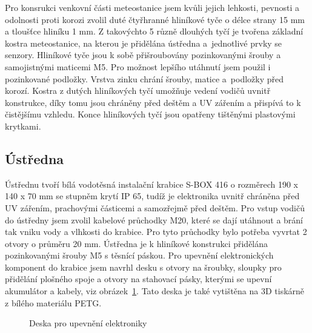         Pro konsrukci venkovní části meteostanice jsem kvůli jejich lehkosti, pevnosti a odolnosti proti korozi zvolil duté čtyřhranné hliníkové tyče o délce strany 15 mm a tloušťce hliníku 1 mm. Z takovýchto 5 různě dlouhých tyčí je tvořena základní kostra meteostanice, na kterou je přidělána ústředna a~jednotlivé prvky se senzory. Hliníkové tyče jsou k sobě přišroubovány pozinkovanými šrouby a samojistnými maticemi M5. Pro možnost lepšího utáhnutí jsem použil i pozinkované podložky. Vrstva zinku chrání šrouby, matice a~podložky před korozí. Kostra z dutých hliníkových tyčí umožňuje vedení vodičů uvnitř konstrukce, díky tomu jsou chráněny před deštěm a UV zářením a přispívá to k čistějšímu vzhledu. Konce hliníkových tyčí jsou opatřeny tištěnými plastovými krytkami.
        \newpage

        \subsection{Ústředna}    
            Ústřednu tvoří bílá vodotěsná instalační krabice S-BOX 416 o rozměrech 190 x 140 x 70 mm se stupněm krytí IP 65, tudíž je elektronika uvnitř chráněna před UV zářením, prachovými částicemi a samozřejmě před deštěm. Pro vstup vodičů do ústředny jsem zvolil kabelové průchodky M20, které se dají utáhnout a brání tak vniku vody a vlhkosti do krabice. Pro tyto průchodky bylo potřeba vyvrtat 2 otvory o průměru 20 mm. Ústředna je k hliníkové konstrukci přidělána pozinkovanými šrouby M5 s těsnící páskou. Pro upevnění elektronických komponent do krabice jsem navrhl desku s otvory na šroubky, sloupky pro přidělání plošného spoje a otvory na stahovací pásky, kterými se upevní akumulátor a kabely, viz obrázek~\ref{Deska}. Tato deska je také vytištěna na 3D tiskárně z bílého materiálu PETG.

            \begin{figure}[htb]
            \caption{Deska pro upevnění elektroniky}
            \label{Deska}
            \end{figure}

